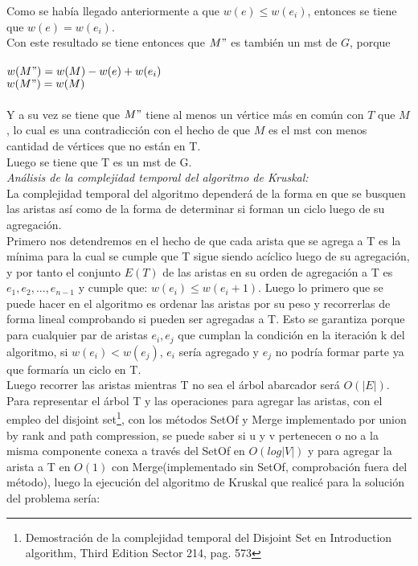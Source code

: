 \documentclass[12pt]{article}
\begin{document}
Como se hab\'ia llegado anteriormente a que $w(e) \leq w(e_i)$, entonces se tiene que $w(e) = w(e_i)$.\\

Con este resultado se tiene entonces que $M"$ es tambi\'en un mst de $G$, porque\\
\\
$w(M") = w(M) - w(e) + w(e_i)$\\
$w(M") = w(M)$\\
\\
Y a su vez se tiene que $M"$ tiene al menos un v\'ertice  m\'as en com\'un con $T$ que $M$, lo cual es una contradicci\'on con el hecho de que $M$ es
el mst con menos cantidad de v\'ertices que no est\'an en T.\\

Luego se tiene que T es un mst de G.\\



\textit{An\'alisis de la complejidad temporal del algoritmo de Kruskal:}\\

La complejidad temporal del algoritmo depender\'a de la forma en que se busquen las aristas as\'i como de la forma de determinar si forman
un ciclo luego de su agregaci\'on.\\

Primero nos detendremos en el hecho de que cada arista que se agrega a T es la m\'inima para la cual se cumple que T sigue siendo ac\'iclico
luego de su agregaci\'on, y por tanto el conjunto $E (T)$ de las aristas en su orden de agregaci\'on a T es ${e_1, e_2, ...,  e_{n-1}}$ y cumple que:
$w(e_i) \leq w(e_i+1)$. Luego lo primero que se puede hacer en el algoritmo es ordenar las aristas por su peso y recorrerlas de forma lineal 
comprobando si pueden ser agregadas a T.  Esto se garantiza porque para cualquier par de aristas $e_i, e_j$ que cumplan la condici\'on en la iteraci\'on
k del algoritmo, si $w (e_i) < w(e_j)$, $e_i$ ser\'ia agregado y  $e_j$ no podr\'ia formar parte ya que formar\'ia un ciclo en T.\\

Luego recorrer las aristas mientras  T no sea el \'arbol abarcador ser\'a $O(|E|)$.  Para representar el \'arbol T y las operaciones para agregar las
aristas, con el empleo del disjoint set\footnote{Demostraci\'on de la complejidad temporal del Disjoint Set en  Introduction algorithm, Third Edition Sector 214, pag. 573}, con los m\'etodos SetOf y Merge implementado por union by rank and path compression, se puede saber
si u y v pertenecen o no a la misma componente conexa a trav\'es del SetOf en $O(log|V|)$ y para agregar la arista a T en 
$O(1)$ con Merge(implementado sin SetOf, comprobaci\'on fuera del m\'etodo), luego la ejecuci\'on
del algoritmo de Kruskal que realic\'e para la soluci\'on del problema ser\'ia:
\end{document}
